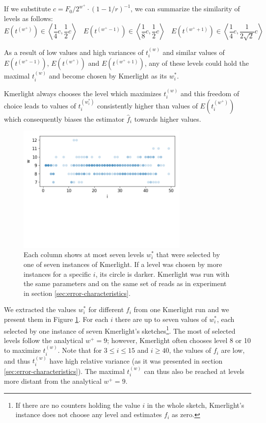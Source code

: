 If we substitute $c = F_0/2^{w^+} \cdot (1-1/r)^{-1}$,
we can summarize the similarity of levels as follows:
\begin{equation} \label{eq:level-similarity}
E(t^{(w^+)}) \in \left\langle \frac{1}{4}c, \frac{1}{2}c  \right\rangle ~~~~
E(t^{(w^+-1)}) \in \left\langle \frac{1}{8}c, \frac{1}{2}c  \right\rangle ~~~~
E(t^{(w^++1)}) \in \left\langle \frac{1}{4}c,\frac{1}{2\sqrt{2}}c  \right\rangle
\end{equation}

As a result of low values and high variances of $t_i^{(w)}$ and similar
values of $E(t^{(w^+-1)})$, $E(t^{(w^+)})$ and $E(t^{(w^++1)})$, any of these levels could
hold the maximal $t_i^{(w)}$ and become chosen by Kmerlight as its $w^*_i$. 

Kmerlight always chooses the level which maximizes $t_i^{(w)}$ and this freedom of choice 
leads to values of $t_i^{(w^*_i)}$ consistently higher than values of $E(t_i^{(w^+)})$
which consequently biases the estimator $\hat f_i$ towards higher values.

\begin{figure}[h]
\centerline{\includegraphics[width=0.75\textwidth, trim={0cm, 5.2cm, 0cm, 0cm}, clip]{images/kmerlight_wstar.png}}
\caption[$w_i^*$ selected by Kmerlight]{Each column 
shows at most seven levels $w_i^*$ that were selected by one of seven instances of Kmerlight.
If a level was chosen by more instances for a specific $i$, its circle is darker.
Kmerlight was run with the same parameters and on the same set of reads as in 
experiment in section \ref{sec:error-characteristics}.}
\label{img:w-selected-by-kmerlight}
\end{figure}

We extracted the values $w_i^*$ for different $f_i$ from one Kmerlight run
and we present them in Figure \ref{img:w-selected-by-kmerlight}.
For each $i$ there are up to seven values of $w_i^*$, each selected by one 
instance of seven Kmerlight's sketches\footnote{If there are no counters holding 
the value $i$ in the whole sketch,  Kmerlight's instance does not choose any level
and estimates $f_i$ as zero.}. The most of selected levels follow the analytical 
$w^+ = 9$; however, Kmerlight often chooses level 8 or 10 to maximize $t_i^{(w)}$. 
Note that for $3\leq i \leq 15$ and $i \geq 40$, the values of $f_i$ are low, and thus 
$t_i^{(w)}$ have high relative variance (as it was presented in section
\ref{sec:error-characteristics}). The maximal $t_i^{(w)}$ can thus also be reached
at levels more distant from the analytical $w^+ = 9$.

